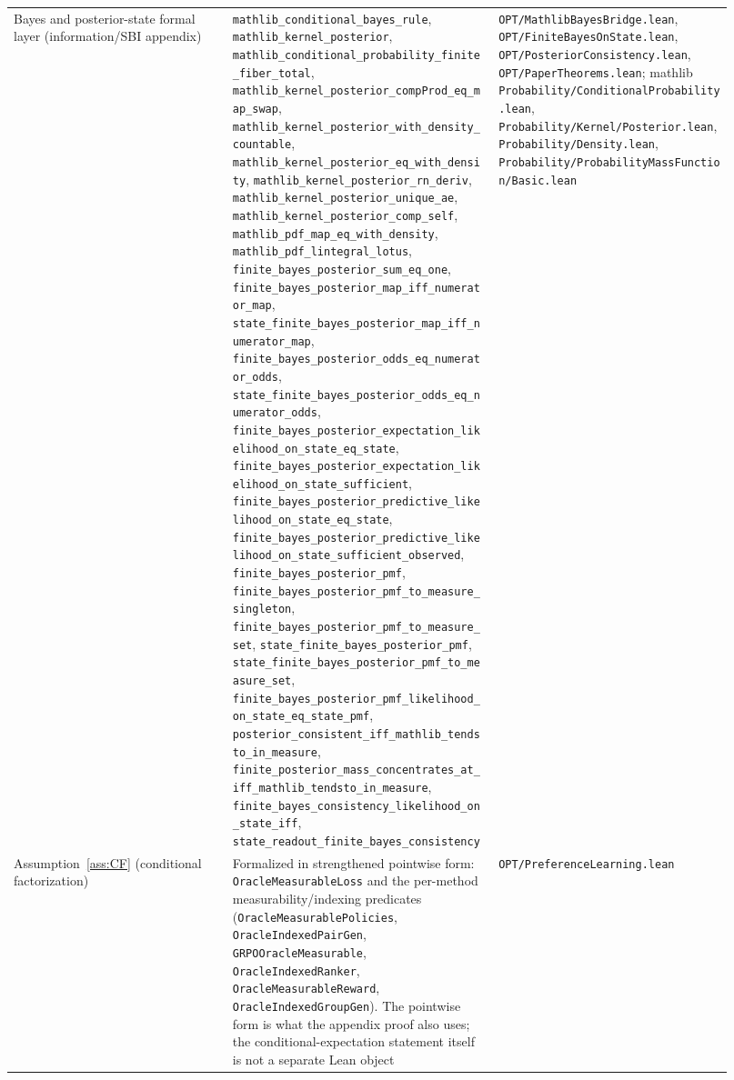 {\begin{longtable}{p{0.28\linewidth}p{0.34\linewidth}p{0.30\linewidth}}
Bayes and posterior-state formal layer (information/SBI appendix) &
\texttt{mathlib\_conditional\_bayes\_rule}, \texttt{mathlib\_kernel\_posterior},
\nolinkurl{mathlib_conditional_probability_finite_fiber_total},
\nolinkurl{mathlib_kernel_posterior_compProd_eq_map_swap},
\nolinkurl{mathlib_kernel_posterior_with_density_countable},
\nolinkurl{mathlib_kernel_posterior_eq_with_density},
\nolinkurl{mathlib_kernel_posterior_rn_deriv},
\nolinkurl{mathlib_kernel_posterior_unique_ae},
\nolinkurl{mathlib_kernel_posterior_comp_self},
\texttt{mathlib\_pdf\_map\_eq\_with\_density},
\texttt{mathlib\_pdf\_lintegral\_lotus},
\texttt{finite\_bayes\_posterior\_sum\_eq\_one},
\nolinkurl{finite_bayes_posterior_map_iff_numerator_map},
\nolinkurl{state_finite_bayes_posterior_map_iff_numerator_map},
\nolinkurl{finite_bayes_posterior_odds_eq_numerator_odds},
\nolinkurl{state_finite_bayes_posterior_odds_eq_numerator_odds},
\nolinkurl{finite_bayes_posterior_expectation_likelihood_on_state_eq_state},
\nolinkurl{finite_bayes_posterior_expectation_likelihood_on_state_sufficient},
\nolinkurl{finite_bayes_posterior_predictive_likelihood_on_state_eq_state},
\nolinkurl{finite_bayes_posterior_predictive_likelihood_on_state_sufficient_observed},
\texttt{finite\_bayes\_posterior\_pmf},
\nolinkurl{finite_bayes_posterior_pmf_to_measure_singleton},
\nolinkurl{finite_bayes_posterior_pmf_to_measure_set},
\texttt{state\_finite\_bayes\_posterior\_pmf},
\nolinkurl{state_finite_bayes_posterior_pmf_to_measure_set},
\nolinkurl{finite_bayes_posterior_pmf_likelihood_on_state_eq_state_pmf},
\nolinkurl{posterior_consistent_iff_mathlib_tendsto_in_measure},
\nolinkurl{finite_posterior_mass_concentrates_at_iff_mathlib_tendsto_in_measure},
\nolinkurl{finite_bayes_consistency_likelihood_on_state_iff},
\texttt{state\_readout\_finite\_bayes\_consistency} &
\texttt{OPT/MathlibBayesBridge.lean}, \texttt{OPT/FiniteBayesOnState.lean},
\texttt{OPT/PosteriorConsistency.lean}, \texttt{OPT/PaperTheorems.lean};
mathlib \texttt{Probability/ConditionalProbability.lean},
\texttt{Probability/Kernel/Posterior.lean},
\texttt{Probability/Density.lean},
\texttt{Probability/ProbabilityMassFunction/Basic.lean} \\

Assumption~\ref{ass:CF} (conditional factorization) &
Formalized in strengthened pointwise form: \texttt{OracleMeasurableLoss} and the
per-method measurability/indexing predicates (\texttt{OracleMeasurablePolicies},
\texttt{OracleIndexedPairGen}, \texttt{GRPOOracleMeasurable},
\texttt{OracleIndexedRanker}, \texttt{OracleMeasurableReward},
\texttt{OracleIndexedGroupGen}). The pointwise form is what the appendix proof
also uses; the conditional-expectation statement itself is not a separate Lean
object &
\texttt{OPT/PreferenceLearning.lean} \\


\end{longtable}}
